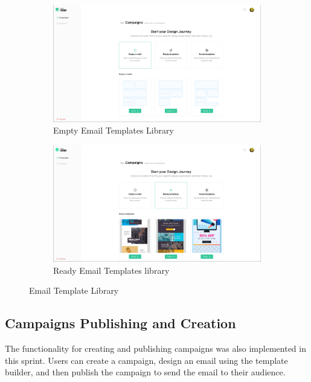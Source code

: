 \begin{figure}[ht]
	\centering
	\begin{subfigure}[b]{0.45\linewidth}
		\includegraphics[width=\linewidth]{Images/Sprint1/screenshots/Screenshot 2024-05-26 214037.png}
		\caption{Empty Email Templates Library}
		\label{fig:Empty Email Templates Library}
	\end{subfigure}
	\hfill
	\begin{subfigure}[b]{0.45\linewidth}
		\includegraphics[width=\linewidth]{Images/Sprint1/screenshots/Screenshot 2024-05-26 214047.png}
		\caption{Ready Email Templates library}
		\label{fig:Ready Email Templates library}
	\end{subfigure}
	\caption{Email Template Library}
\end{figure}

\subsection{Campaigns Publishing and Creation}

The functionality for creating and publishing campaigns was also implemented in this sprint. Users can create a campaign, design an email using the template builder, and then publish the campaign to send the email to their audience.

